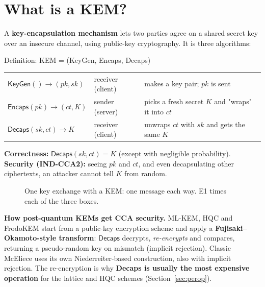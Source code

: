 \documentclass[10.5pt,a4paper]{article}
\newcommand{\sect}[1]{\section{#1}}
\newcommand{\key}[1]{\textbf{#1}}
\begin{document}
\sect{What is a KEM?}

A \key{key-encapsulation mechanism} lets two parties agree on a shared secret key over an insecure channel, using public-key cryptography. It is three algorithms:

\begin{defbox}{Definition: KEM = (KeyGen, Encaps, Decaps)}
\begin{tabular}{@{}l@{\quad}l@{\quad}l@{}}
$\mathsf{KeyGen}() \to (pk, sk)$ & receiver (client) & makes a key pair; $pk$ is sent\\
$\mathsf{Encaps}(pk) \to (ct, K)$ & sender (server) & picks a fresh secret $K$ and "wraps" it into $ct$\\
$\mathsf{Decaps}(sk, ct) \to K$ & receiver (client) & unwraps $ct$ with $sk$ and gets the same $K$\\
\end{tabular}\par\smallskip
\key{Correctness:} $\mathsf{Decaps}(sk, ct) = K$ (except with negligible probability).
\key{Security (IND-CCA2):} seeing $pk$ and $ct$, and even decapsulating other ciphertexts, an attacker cannot tell $K$ from random.
\end{defbox}

\begin{figure}[H]
\centering
{}
\caption{One key exchange with a KEM: one message each way. E1 times each of the three boxes.}
\label{fig:kem}
\end{figure}

\textbf{How post-quantum KEMs get CCA security.} ML-KEM, HQC and FrodoKEM start from a public-key encryption scheme and apply a \key{Fujisaki–Okamoto-style transform}: $\mathsf{Decaps}$ decrypts, \emph{re-encrypts} and compares, returning a pseudo-random key on mismatch (implicit rejection). Classic McEliece uses its own Niederreiter-based construction, also with implicit rejection. The re-encryption is why \key{Decaps is usually the most expensive operation} for the lattice and HQC schemes (Section~\ref{sec:perop}).
\end{document}
